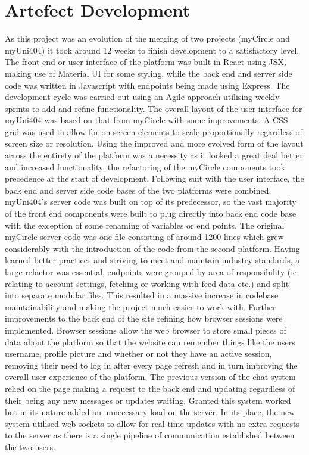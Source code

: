 \documentclass[lettersize,journal]{IEEEtran}
\begin{document}
\section{Artefect Development}
	As this project was an evolution of the merging of two projects (myCircle and myUni404) it took around 12 weeks to finish development to a satisfactory level. The front end or user interface of
	the platform was built in React using JSX, making use of Material UI for some styling, while the back end and server side code was written in Javascript with endpoints being made using
	Express. The development cycle was carried out using an Agile approach utilising weekly sprints to add and refine functionality. The overall layout of the user interface for myUni404 was based 
	on that from myCircle with some	improvements. A CSS grid was used to allow for on-screen elements to scale proportionally regardless of screen size or resolution. Using the improved and more
	evolved form of the layout across the entirety of the platform was a necessity as it looked a great deal better and increased functionality, the refactoring of the myCircle components took
	precedence at the start of development.	Following suit with the user interface, the back end and server side code bases of the two platforms were combined. myUni404's server code was built on
	top of its predecessor, so the vast majority of the front end components were built to plug directly into back end code base with the exception of some renaming of variables or end points. The
	original myCircle server code was one file consisting of around 1200 lines which grew considerably with the introduction of the code from the second platform. Having learned better practices and
	striving to meet and maintain industry standards, a large refactor was essential, endpoints were grouped by area of responsibility (ie relating to account settings, fetching or working with feed
	data etc.) and split into separate modular files. This resulted in a massive increase in codebase maintainability and making the project much easier to work with. Further improvements to the
	back end of the site refining how browser sessions were implemented. Browser sessions allow the web browser to store small pieces of data about the platform so that the website can remember
	things like the users username, profile picture and whether or not they have an active session, removing their need to log in after every page refresh and in turn improving the overall user
	experience of the platform. The previous version of the chat system relied on the page making a request to the back end and updating regardless	of their being any new messages or updates
	waiting. Granted this system worked but in its nature added an unnecessary load on the server. In its place, the new system utilised web sockets to allow for real-time updates with no extra
	requests to the server as there is a single pipeline of communication established between the two users.
\end{document}
